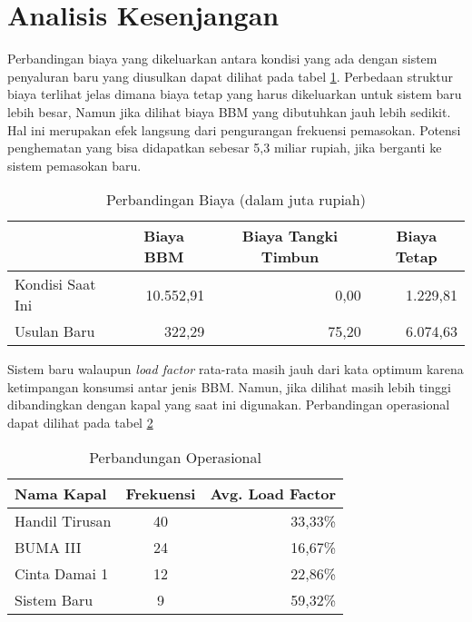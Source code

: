 \section{Analisis Kesenjangan}
\label{sec:analisis-kesenjangan}

Perbandingan biaya yang dikeluarkan antara kondisi yang ada dengan sistem penyaluran baru yang diusulkan dapat dilihat pada tabel \ref{tab:perbandingan-biaya}. Perbedaan struktur biaya terlihat jelas dimana biaya tetap yang harus dikeluarkan untuk sistem baru lebih besar, Namun jika dilihat biaya BBM yang dibutuhkan jauh lebih sedikit. Hal ini merupakan efek langsung dari pengurangan frekuensi pemasokan. Potensi penghematan yang bisa didapatkan sebesar 5,3 miliar rupiah, jika berganti ke sistem pemasokan baru. 

\begin{table}[htbp]
\centering
\begin{tabular}{|l|r|r|r|}
\hline
& \multicolumn{1}{c|}{Biaya BBM} & \multicolumn{1}{c|}{Biaya Tangki Timbun} & \multicolumn{1}{c|}{Biaya Tetap} \\
\hline
Kondisi Saat Ini & 10.552,91 & 0,00 & 1.229,81 \\
Usulan Baru & 322,29 & 75,20 & 6.074,63 \\
\hline
\end{tabular}
\caption{Perbandingan Biaya (dalam juta rupiah)}
\label{tab:perbandingan-biaya}
\end{table}

Sistem baru walaupun \emph{load factor} rata-rata masih jauh dari kata optimum karena ketimpangan konsumsi antar jenis BBM. Namun, jika dilihat masih lebih tinggi dibandingkan dengan kapal yang saat ini digunakan. Perbandingan operasional dapat dilihat pada tabel \ref{tab:operational-gap} 


\begin{table}[htbp]
\centering
\begin{tabular}{|l|c|r|}
\hline
\textbf{Nama Kapal} & \textbf{Frekuensi} & \textbf{Avg. Load Factor} \\
\hline
Handil Tirusan & 40 & 33,33\% \\
BUMA III & 24 & 16,67\% \\
Cinta Damai 1 & 12 & 22,86\% \\
Sistem Baru & 9 & 59,32\% \\
\hline
\end{tabular}
\caption{Perbandungan Operasional}
\label{tab:operational-gap}
\end{table}